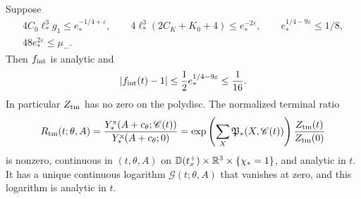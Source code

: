 \begin{proposition}\label{prop:interacting-factor}
Suppose
\begin{gather}
 4C_0\ell_*^3g_1\le e_*^{-1/4+\varepsilon},\qquad
 4\ell_*^3(2C_K+K_0+4)\le e_*^{-2\varepsilon},\qquad
 e_*^{1/4-9\varepsilon}\le1/8,
                                      \label{eq:interacting-factor-conditions}\\
 48e_*^{2\varepsilon}\le\mu_- .
                                      \label{eq:interacting-small-complex-mass}
\end{gather}
Then $f_{\rm int}$ is analytic and
\begin{equation}\label{eq:interacting-factor-bound}
 |f_{\rm int}(t)-1|\le\frac12e_*^{1/4-9\varepsilon}
                              \le\frac1{16}.
\end{equation}
In particular $Z_{\rm tm}$ has no zero on the
polydisc. The normalized terminal ratio
\begin{equation}\label{eq:interacting-terminal-ratio}
 R_{\rm tm}(t;\theta,A)=
 \frac{Y_*^{\rm x}(A+c_\theta;\mathscr C(t))}
      {Y_*^{\rm x}(A+c_\theta;0)}
 =\exp\left(\sum_X\mathfrak P_*(X,\mathscr C(t))\right)
       \frac{Z_{\rm tm}(t)}{Z_{\rm tm}(0)}
\end{equation}
is nonzero, continuous in $(t,\theta,A)$ on
$\mathbb D(t_x^+)\times\mathbb R^3\times\{\chi_*=1\}$,
and analytic in $t$. It has a unique continuous
logarithm $\mathcal G(t;\theta,A)$ that vanishes
at zero, and this logarithm is analytic in $t$.
\end{proposition}

